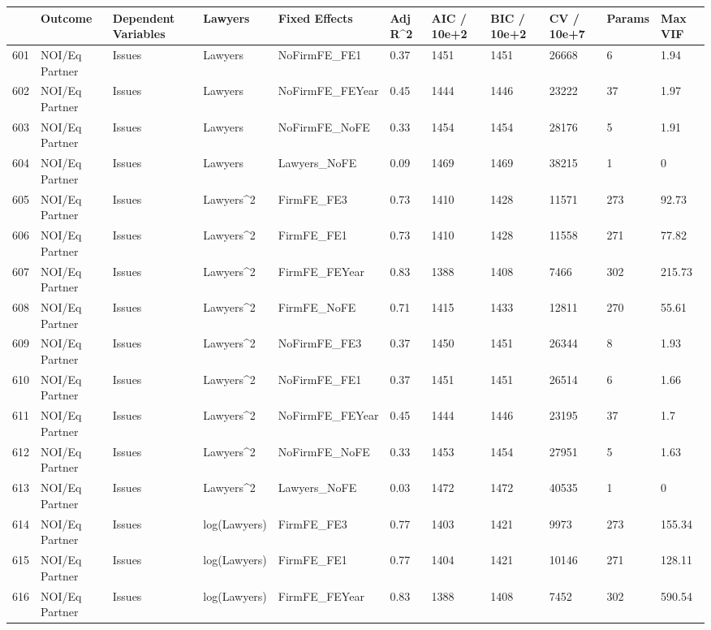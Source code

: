 \documentclass{article}
\begin{document}
\begin{table}[H]
\centering
\begin{tabular}{rllllllllll}
  \hline
 & Outcome & Dependent Variables & Lawyers & Fixed Effects & Adj R^2 & AIC / 10e+2 & BIC / 10e+2 & CV / 10e+7 & Params & Max VIF \\ 
  \hline
601 & NOI/Eq Partner & Issues & Lawyers & NoFirmFE\_FE1 & 0.37 & 1451 & 1451 & 26668 & 6 & 1.94 \\ 
  602 & NOI/Eq Partner & Issues & Lawyers & NoFirmFE\_FEYear & 0.45 & 1444 & 1446 & 23222 & 37 & 1.97 \\ 
  603 & NOI/Eq Partner & Issues & Lawyers & NoFirmFE\_NoFE & 0.33 & 1454 & 1454 & 28176 & 5 & 1.91 \\ 
  604 & NOI/Eq Partner & Issues & Lawyers & Lawyers\_NoFE & 0.09 & 1469 & 1469 & 38215 & 1 & 0 \\ 
  605 & NOI/Eq Partner & Issues & Lawyers^2 & FirmFE\_FE3 & 0.73 & 1410 & 1428 & 11571 & 273 & 92.73 \\ 
  606 & NOI/Eq Partner & Issues & Lawyers^2 & FirmFE\_FE1 & 0.73 & 1410 & 1428 & 11558 & 271 & 77.82 \\ 
  607 & NOI/Eq Partner & Issues & Lawyers^2 & FirmFE\_FEYear & 0.83 & 1388 & 1408 & 7466 & 302 & 215.73 \\ 
  608 & NOI/Eq Partner & Issues & Lawyers^2 & FirmFE\_NoFE & 0.71 & 1415 & 1433 & 12811 & 270 & 55.61 \\ 
  609 & NOI/Eq Partner & Issues & Lawyers^2 & NoFirmFE\_FE3 & 0.37 & 1450 & 1451 & 26344 & 8 & 1.93 \\ 
  610 & NOI/Eq Partner & Issues & Lawyers^2 & NoFirmFE\_FE1 & 0.37 & 1451 & 1451 & 26514 & 6 & 1.66 \\ 
  611 & NOI/Eq Partner & Issues & Lawyers^2 & NoFirmFE\_FEYear & 0.45 & 1444 & 1446 & 23195 & 37 & 1.7 \\ 
  612 & NOI/Eq Partner & Issues & Lawyers^2 & NoFirmFE\_NoFE & 0.33 & 1453 & 1454 & 27951 & 5 & 1.63 \\ 
  613 & NOI/Eq Partner & Issues & Lawyers^2 & Lawyers\_NoFE & 0.03 & 1472 & 1472 & 40535 & 1 & 0 \\ 
  614 & NOI/Eq Partner & Issues & log(Lawyers) & FirmFE\_FE3 & 0.77 & 1403 & 1421 & 9973 & 273 & 155.34 \\ 
  615 & NOI/Eq Partner & Issues & log(Lawyers) & FirmFE\_FE1 & 0.77 & 1404 & 1421 & 10146 & 271 & 128.11 \\ 
  616 & NOI/Eq Partner & Issues & log(Lawyers) & FirmFE\_FEYear & 0.83 & 1388 & 1408 & 7452 & 302 & 590.54 \\ 

\end{tabular}
\end{table}
\end{document}
